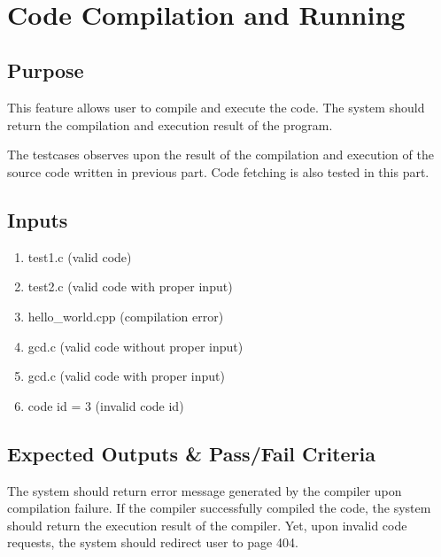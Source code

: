 ~

\section{Code Compilation and Running}
\subsection{Purpose}
This feature allows user to compile and execute the code. The system should return the compilation and execution result of the program.

The testcases observes upon the result of the compilation and execution of the source code written in previous part. Code fetching is also tested in this part.

\subsection{Inputs}
\begin{enumerate}
  \item test1.c (valid code)
  \item test2.c (valid code with proper input)
  \item hello\_world.cpp (compilation error)
  \item gcd.c (valid code without proper input)
  \item gcd.c (valid code with proper input)
  \item code id = 3 (invalid code id)
\end{enumerate}

\subsection{Expected Outputs \& Pass/Fail Criteria}
The system should return error message generated by the compiler upon compilation failure. If the compiler successfully compiled the code, the system should return the execution result of the compiler. Yet, upon invalid code requests, the system should redirect user to page 404.

~

